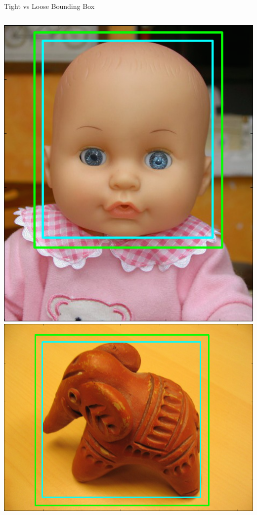 \documentclass[compress,aspectratio=43]{beamer}
\begin{document}
\begin{frame}{Tight vs Loose Bounding Box}
\begin{columns}
{\includegraphics[width=1\linewidth]{figures/hyperparameter_tuning/bounding_boxes/doll-bbox.png}\\
\includegraphics[width=1\linewidth]{figures/hyperparameter_tuning/bounding_boxes/elefant-bbox.png}\\
}
\end{columns}
\end{frame}
\end{document}
